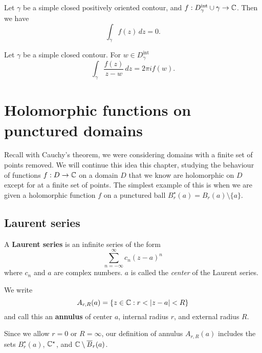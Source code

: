 
\begin{theorem}
    Let $\gamma$ be a simple closed positively oriented contour,
    and $f: D_\gamma^\text{int} \cup \gamma \to \mathbb{C}$.
    Then we have
    \[
        \int_\gamma f(z) \,dz = 0.
    \]
\end{theorem}

\begin{theorem}
    Let $\gamma$ be a simple closed contour.
    For $w \in D^\text{int}_\gamma$
    \[
        \int_\gamma \frac{f(z)}{z - w} \,dz
        = 2\pi i f(w).
    \]
\end{theorem}

\chapter{Holomorphic functions on punctured domains}

Recall with Cauchy's theorem, we were considering domains
with a finite set of points removed. 
We will continue this idea this chapter, studying
the behaviour of functions $f: D \to \mathbb{C}$ on a domain $D$
that we know are holomorphic on $D$ except for at a finite set
of points.
The simplest example of this is when we are given a holomorphic
function $f$ on a punctured ball
$B_r^\star(a) = B_r(a) \setminus \{a\}$.

\section{Laurent series}

\begin{definition}
    A \textbf{Laurent series} is an infinite series
    of the form
    \[
        \sum_{n=-\infty}^\infty c_n(z-a)^n
    \]
    where $c_n$ and $a$ are complex numbers.
    $a$ is called the \emph{center} of the Laurent series.
\end{definition}

\begin{definition}[Annulus]
    We write
    \[
        A_{r,R}(a) = \{z \in \mathbb{C}: r < \left\lvert z - a\right\rvert < R\}
    \]
    and call this an \textbf{annulus} of center $a$,
    internal radius $r$, and external radius $R$.
\end{definition}

\begin{remark}
    Since we allow $r = 0$ or $R = \infty$, our definition
    of annulus $A_{r,R}(a)$ includes the sets
    $B_r^\star(a)$, 
    $\mathbb{C}^\star$, and 
    $\mathbb{C} \setminus \overline B_r(a)$.
\end{remark}

